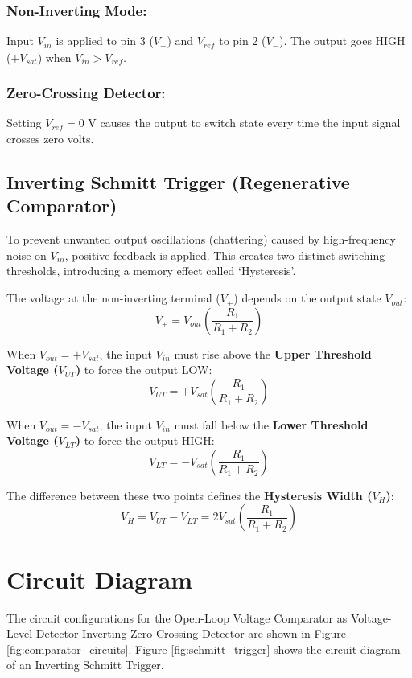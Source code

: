 \subsubsection{Non-Inverting Mode:} Input $V_{in}$ is applied to pin 3 ($V_+$) and $V_{ref}$ to pin 2 ($V_-$). The output goes HIGH ($+V_{sat}$) when $V_{in} > V_{ref}$.

\subsubsection{Zero-Crossing Detector:} Setting $V_{ref} = 0\text{ V}$ causes the output to switch state every time the input signal crosses zero volts.

\subsection{Inverting Schmitt Trigger (Regenerative Comparator)}
To prevent unwanted output oscillations (chattering) caused by high-frequency noise on $V_{in}$, positive feedback is applied. This creates two distinct switching thresholds, introducing a memory effect called `Hysteresis'.

The voltage at the non-inverting terminal ($V_+$) depends on the output state $V_{out}$:
\begin{equation}
	V_+ = V_{out} \left( \frac{R_1}{R_1 + R_2} \right)
\end{equation}

When $V_{out} = +V_{sat}$, the input $V_{in}$ must rise above the \textbf{Upper Threshold Voltage ($V_{UT}$)} to force the output LOW:
\begin{equation}
	V_{UT} = +V_{sat} \left( \frac{R_1}{R_1 + R_2} \right)
\end{equation}

When $V_{out} = -V_{sat}$, the input $V_{in}$ must fall below the \textbf{Lower Threshold Voltage ($V_{LT}$)} to force the output HIGH:
\begin{equation}
	V_{LT} = -V_{sat} \left( \frac{R_1}{R_1 + R_2} \right)
\end{equation}

The difference between these two points defines the \textbf{Hysteresis Width ($V_H$)}:
\begin{equation}
	V_H = V_{UT} - V_{LT} = 2 V_{sat} \left( \frac{R_1}{R_1 + R_2} \right)
\end{equation}

\section{Circuit Diagram}
The circuit configurations for the Open-Loop Voltage Comparator as Voltage-Level Detector Inverting Zero-Crossing Detector are shown in Figure \ref{fig:comparator_circuits}. Figure \ref{fig:schmitt_trigger} shows the circuit diagram of an Inverting Schmitt Trigger.

